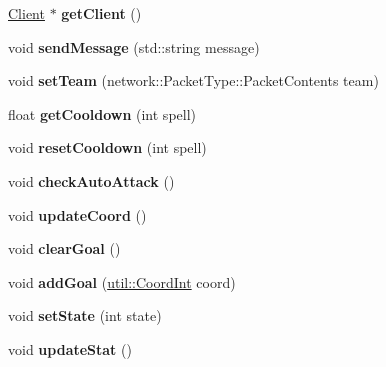 \begin{DoxyCompactItemize}
\item 
\hypertarget{class_player_a6d570bc286a2bdeef957163a3428b30b}{\hyperlink{class_client}{Client} $\ast$ {\bfseries get\-Client} ()}\label{class_player_a6d570bc286a2bdeef957163a3428b30b}

\item 
\hypertarget{class_player_ad80ca388a37acd7a223b7fe5d51a8d48}{void {\bfseries send\-Message} (std\-::string message)}\label{class_player_ad80ca388a37acd7a223b7fe5d51a8d48}

\item 
\hypertarget{class_player_a3970907e875aee7542243b1205462f23}{void {\bfseries set\-Team} (network\-::\-Packet\-Type\-::\-Packet\-Contents team)}\label{class_player_a3970907e875aee7542243b1205462f23}

\item 
\hypertarget{class_player_a75eef8dae7f88abf5cf24a1846c6757e}{float {\bfseries get\-Cooldown} (int spell)}\label{class_player_a75eef8dae7f88abf5cf24a1846c6757e}

\item 
\hypertarget{class_player_ac1218d3d4834df9aec983afb39618d16}{void {\bfseries reset\-Cooldown} (int spell)}\label{class_player_ac1218d3d4834df9aec983afb39618d16}

\item 
\hypertarget{class_player_a816c221d643257c762200bf00ca91cbe}{void {\bfseries check\-Auto\-Attack} ()}\label{class_player_a816c221d643257c762200bf00ca91cbe}

\item 
\hypertarget{class_player_a1b97d41f44a63c07032cd5fe8f482a22}{void {\bfseries update\-Coord} ()}\label{class_player_a1b97d41f44a63c07032cd5fe8f482a22}

\item 
\hypertarget{class_player_a6e35398beaad7a7e3c3756e73bd90ace}{void {\bfseries clear\-Goal} ()}\label{class_player_a6e35398beaad7a7e3c3756e73bd90ace}

\item 
\hypertarget{class_player_a1ab1a7a3eeafd78e8f5449b4a01b087f}{void {\bfseries add\-Goal} (\hyperlink{classutil_1_1_coordinates}{util\-::\-Coord\-Int} coord)}\label{class_player_a1ab1a7a3eeafd78e8f5449b4a01b087f}

\item 
\hypertarget{class_player_a0e6df9731182e1e9fb909a2dc922e054}{void {\bfseries set\-State} (int state)}\label{class_player_a0e6df9731182e1e9fb909a2dc922e054}

\item 
\hypertarget{class_player_adf8431c4d82a51d88c7fc2a72e973ba1}{void {\bfseries update\-Stat} ()}\label{class_player_adf8431c4d82a51d88c7fc2a72e973ba1}


\end{DoxyCompactItemize}
